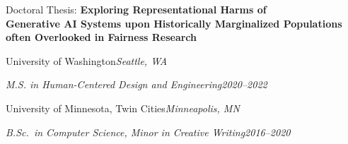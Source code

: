 \documentclass[10pt, letterpaper]{article}
\begin{document}
\vspace{-15pt}
Doctoral Thesis: \textbf{Exploring Representational Harms of \\  Generative AI Systems upon Historically  Marginalized Populations \\ often Overlooked in Fairness Research}\par

\vspace{2pt}

\noindent\large{University of Washington}\hfill\textcolor{uwpurple}{\textit{Seattle, WA}}\par
\noindent\textit{M.S. in Human-Centered Design and Engineering}\hfill\textcolor{uwpurple}{\textit{2020--2022}}\par

\vspace{2pt}

\noindent\large{University of Minnesota, Twin Cities}\hfill\textcolor{umnmaroon}{\textit{Minneapolis, MN}}\par
\noindent\textit{B.Sc.\ in Computer Science, Minor in Creative Writing}\hfill\textcolor{umnmaroon}{\textit{2016--2020}}\par



\end{document}
